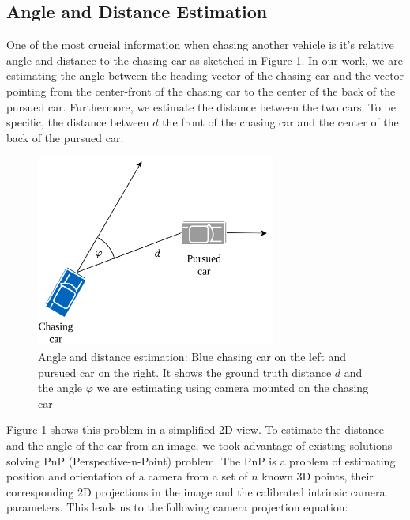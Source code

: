 \subsection{Angle and Distance Estimation}
One of the most crucial information when chasing another vehicle is it's relative angle and distance to the chasing car as sketched in Figure \ref{f:chasing_diagram}. In our work, we are estimating the angle between the heading vector of the chasing car and the vector pointing from the center-front of the chasing car to the center of the back of the pursued car. Furthermore, we estimate the distance between the two cars. To be specific, the distance between $d$ the front of the chasing car and the center of the back of the pursued car. \par


\begin{figure}[h!]
    \centering
    \includegraphics[width=0.7\textwidth]{images/ChasingDiagram.png}
    
    \caption{Angle and distance estimation: Blue chasing car on the left and pursued car on the right. It shows the ground truth distance $d$ and the angle $\varphi$ we are estimating using camera mounted on the chasing car }\label{f:chasing_diagram}
\end{figure}

Figure \ref{f:chasing_diagram} shows this problem in a simplified 2D view. To estimate the distance and the angle of the car from an image, we took advantage of existing solutions solving PnP (Perspective-n-Point) problem. The PnP is a problem of estimating position and orientation of a camera from a set of $n$ known 3D points, their corresponding 2D projections in the image and the calibrated intrinsic camera parameters. This leads us to the following camera projection equation: \par


